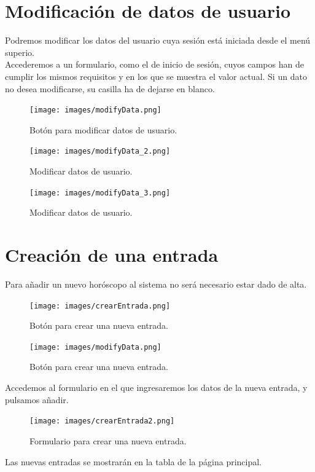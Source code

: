\documentclass[12pt, twoside]{report}
\begin{document}
\section{Modificación de datos de usuario}
Podremos modificar los datos del usuario cuya sesión está iniciada desde el menú superio.\\
Accederemos a un formulario, como el de inicio de sesión, cuyos campos han de cumplir los mismos requisitos y en los que se muestra el valor actual. Si un dato no desea modificarse, su casilla ha de dejarse en blanco.
\begin{figure}[h]
\begin{center}
\texttt{[image: images/modifyData.png]}
\end{center}
\caption{\label{inicio} Botón para modificar datos de usuario.}
\end{figure}
\begin{figure}[h]
\begin{center}
\texttt{[image: images/modifyData\_2.png]}
\end{center}
\caption{\label{inicio} Modificar datos de usuario.}
\end{figure}
\begin{figure}[h]
\begin{center}
\texttt{[image: images/modifyData\_3.png]}
\end{center}
\caption{\label{inicio} Modificar datos de usuario.}
\end{figure}
\clearpage

\section{Creación de una entrada}
Para añadir un nuevo horóscopo al sistema no será necesario estar dado de alta.
\begin{figure}[h]
\begin{center}
\texttt{[image: images/crearEntrada.png]}
\end{center}
\caption{\label{inicio} Botón para crear una nueva entrada.}
\end{figure}
\begin{figure}[h]
\begin{center}
\texttt{[image: images/modifyData.png]}
\end{center}
\caption{\label{inicio} Botón para crear una nueva entrada.}
\end{figure}
\newline
Accedemos al formulario en el que ingresaremos los datos de la nueva entrada, y pulsamos añadir.
\begin{figure}[h]
\begin{center}
\texttt{[image: images/crearEntrada2.png]}
\end{center}
\caption{\label{inicio} Formulario para crear una nueva entrada.}
\end{figure}
\newline
Las nuevas entradas se mostrarán en la tabla de la página principal.
\clearpage
\end{document}
